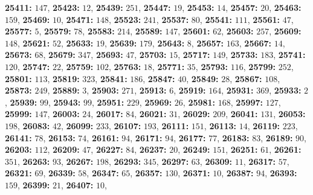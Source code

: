 \textsf{\bfseries 25411:} $147$, \textsf{\bfseries 25423:} $12$, \textsf{\bfseries 25439:} $251$, \textsf{\bfseries 25447:} $19$, \textsf{\bfseries 25453:} $14$, \textsf{\bfseries 25457:} $20$, \textsf{\bfseries 25463:} $159$, \textsf{\bfseries 25469:} $10$, \textsf{\bfseries 25471:} $148$, \textsf{\bfseries 25523:} $241$, \textsf{\bfseries 25537:} $80$, \textsf{\bfseries 25541:} $111$, \textsf{\bfseries 25561:} $47$, \textsf{\bfseries 25577:} $5$, \textsf{\bfseries 25579:} $78$, \textsf{\bfseries 25583:} $214$, \textsf{\bfseries 25589:} $147$, \textsf{\bfseries 25601:} $62$, \textsf{\bfseries 25603:} $257$, \textsf{\bfseries 25609:} $148$, \textsf{\bfseries 25621:} $52$, \textsf{\bfseries 25633:} $19$, \textsf{\bfseries 25639:} $179$, \textsf{\bfseries 25643:} $8$, \textsf{\bfseries 25657:} $163$, \textsf{\bfseries 25667:} $14$, \textsf{\bfseries 25673:} $68$, \textsf{\bfseries 25679:} $347$, \textsf{\bfseries 25693:} $47$, \textsf{\bfseries 25703:} $15$, \textsf{\bfseries 25717:} $149$, \textsf{\bfseries 25733:} $183$, \textsf{\bfseries 25741:} $120$, \textsf{\bfseries 25747:} $22$, \textsf{\bfseries 25759:} $102$, \textsf{\bfseries 25763:} $18$, \textsf{\bfseries 25771:} $35$, \textsf{\bfseries 25793:} $116$, \textsf{\bfseries 25799:} $252$, \textsf{\bfseries 25801:} $113$, \textsf{\bfseries 25819:} $323$, \textsf{\bfseries 25841:} $186$, \textsf{\bfseries 25847:} $40$, \textsf{\bfseries 25849:} $28$, \textsf{\bfseries 25867:} $108$, \textsf{\bfseries 25873:} $249$, \textsf{\bfseries 25889:} $3$, \textsf{\bfseries 25903:} $271$, \textsf{\bfseries 25913:} $6$, \textsf{\bfseries 25919:} $164$, \textsf{\bfseries 25931:} $369$, \textsf{\bfseries 25933:} $2$, \textsf{\bfseries 25939:} $99$, \textsf{\bfseries 25943:} $99$, \textsf{\bfseries 25951:} $229$, \textsf{\bfseries 25969:} $26$, \textsf{\bfseries 25981:} $168$, \textsf{\bfseries 25997:} $127$, \textsf{\bfseries 25999:} $147$, \textsf{\bfseries 26003:} $24$, \textsf{\bfseries 26017:} $84$, \textsf{\bfseries 26021:} $31$, \textsf{\bfseries 26029:} $209$, \textsf{\bfseries 26041:} $131$, \textsf{\bfseries 26053:} $198$, \textsf{\bfseries 26083:} $42$, \textsf{\bfseries 26099:} $233$, \textsf{\bfseries 26107:} $193$, \textsf{\bfseries 26111:} $151$, \textsf{\bfseries 26113:} $14$, \textsf{\bfseries 26119:} $223$, \textsf{\bfseries 26141:} $78$, \textsf{\bfseries 26153:} $74$, \textsf{\bfseries 26161:} $94$, \textsf{\bfseries 26171:} $94$, \textsf{\bfseries 26177:} $77$, \textsf{\bfseries 26183:} $83$, \textsf{\bfseries 26189:} $90$, \textsf{\bfseries 26203:} $112$, \textsf{\bfseries 26209:} $47$, \textsf{\bfseries 26227:} $84$, \textsf{\bfseries 26237:} $20$, \textsf{\bfseries 26249:} $151$, \textsf{\bfseries 26251:} $61$, \textsf{\bfseries 26261:} $351$, \textsf{\bfseries 26263:} $93$, \textsf{\bfseries 26267:} $198$, \textsf{\bfseries 26293:} $345$, \textsf{\bfseries 26297:} $63$, \textsf{\bfseries 26309:} $11$, \textsf{\bfseries 26317:} $57$, \textsf{\bfseries 26321:} $69$, \textsf{\bfseries 26339:} $58$, \textsf{\bfseries 26347:} $65$, \textsf{\bfseries 26357:} $130$, \textsf{\bfseries 26371:} $10$, \textsf{\bfseries 26387:} $94$, \textsf{\bfseries 26393:} $159$, \textsf{\bfseries 26399:} $21$, \textsf{\bfseries 26407:} $10$, 
